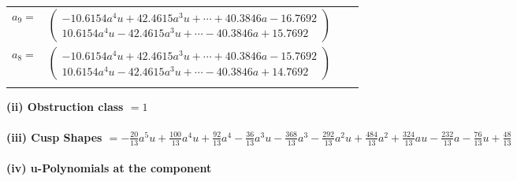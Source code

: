 \documentclass[1p]{elsarticle_modified}
\theoremstyle{definition}
\begin{document}
\begin{tabular}{m{7pt} m{180pt} m{7pt} m{180pt} }
\flushright $a_{9}=$&$\begin{pmatrix}-10.6154 a^{4} u+42.4615 a^{3} u+\cdots+40.3846 a-16.7692\\10.6154 a^{4} u-42.4615 a^{3} u+\cdots-40.3846 a+15.7692\end{pmatrix}$ \\
\flushright $a_{8}=$&$\begin{pmatrix}-10.6154 a^{4} u+42.4615 a^{3} u+\cdots+40.3846 a-15.7692\\10.6154 a^{4} u-42.4615 a^{3} u+\cdots-40.3846 a+14.7692\end{pmatrix}$\\&\end{tabular}
\flushleft \textbf{(ii) Obstruction class $= 1$}\\~\\
\flushleft \textbf{(iii) Cusp Shapes $= -\frac{20}{13} a^5 u+\frac{100}{13} a^4 u+\frac{92}{13} a^4-\frac{36}{13} a^3 u-\frac{368}{13} a^3-\frac{292}{13} a^2 u+\frac{484}{13} a^2+\frac{324}{13} a u-\frac{232}{13} a-\frac{76}{13} u+\frac{48}{13}$}\\~\\
\newpage\renewcommand{\arraystretch}{1}
\flushleft \textbf{(iv) u-Polynomials at the component}\newline \\
\end{document}
